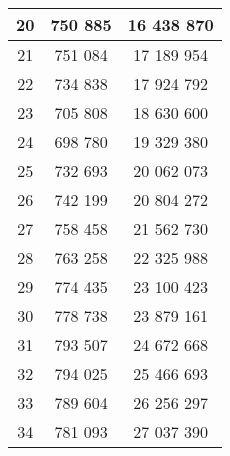 \begin{center}
\begin{tabular}{|c|c|c|}
          20  &  750 885  &  16 438 870 \\ \hline
          21  &  751 084  &  17 189 954 \\ \hline
          22  &  734 838  &  17 924 792 \\ \hline
          23  &  705 808  &  18 630 600 \\ \hline
          24  &  698 780  &  19 329 380 \\ \hline
          25  &  732 693  &  20 062 073 \\ \hline
          26  &  742 199  &  20 804 272 \\ \hline
          27  &  758 458  &  21 562 730 \\ \hline
          28  &  763 258  &  22 325 988 \\ \hline
          29  &  774 435  &  23 100 423 \\ \hline
          30  &  778 738  &  23 879 161 \\ \hline
          31  &  793 507  &  24 672 668 \\ \hline
          32  &  794 025  &  25 466 693 \\ \hline
          33  &  789 604  &  26 256 297 \\ \hline
          34  &  781 093  &  27 037 390 \\ \hline
     \end{tabular}
\end{center}
\newpage

